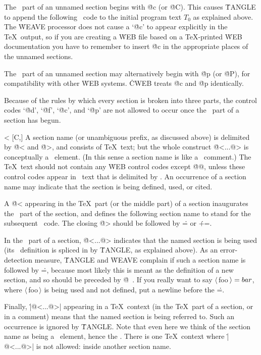\@c [\oP,\oT] The \Cee\ part of an unnamed section begins with \.{@c}
(or \.{@C}). This causes \.{TANGLE} to append the following \Cee\ code
to the initial program text $T_0$ as explained above. The \.{WEAVE}
processor does not cause a `\.{@c}' to appear explicitly in the \TeX\
output, so if you are creating a \.{WEB} file based on a \TeX-printed
\.{WEB} documentation you have to remember to insert \.{@c} in the
appropriate places of the unnamed sections.

\@p [\oP,\oT] The \Cee\ part of an unnamed section may alternatively begin
with \.{@p} (or \.{@P}), for compatibility with other \.{WEB} systems.
\.{CWEB} treats \.{@c} and \.{@p} identically.

\more Because of the rules by which every section is broken into three parts,
the control codes `\.{@d}', `\.{@f}', `\.{@c}', and `\.{@p}'
are not allowed to occur once the \Cee\ part of a section has begun.

\@< [C,\oT] A section name (or unambiguous prefix, as discussed above)
is delimited by \.{@<} and \.{@>}, and consists of \TeX\ text;
but the whole construct \.{@<...@>} is conceptually a \Cee\ element.
(In this sense a section name is like a \Cee\ comment.)
The \TeX\ text should not contain any \.{WEB} control codes
except \.{@@}, unless these control codes appear in \Cee\ text that
is delimited by \pb.  An occurrence of a section name may indicate
that the section is being defined, used, or cited.

\more
A \.{@<} appearing in the \TeX\ part (or the middle part) of a section
inaugurates the \Cee\ part of the section, and defines the following section
name to stand for the subsequent \Cee\ code. The closing \.{@>} should be
followed by \.{=} or \.{+=}.

\more
In the \Cee\ part of a section, \.{@<...@>} indicates that the named
section is being used (its \Cee\ definition is spliced in by
\.{TANGLE}, as explained above).  As an error-detection measure,
\.{TANGLE} and \.{WEAVE} complain if such a section name is followed
by \.=, because most likely this is meant as the definition of a new
section, and so should be preceded by \.{@\ }.  If you really want to
say $\langle\,$foo$\,\rangle=\\{bar}$, where $\langle\,$foo$\,\rangle$
is being used and not defined, put a newline before the \.=.

\more
Finally, \.{|@<...@>|} appearing in a \TeX\ context (in the \TeX\ part
of a section, or in a comment) means that the named section is being
referred to.  Such an occurrence is ignored by \.{TANGLE}. Note that
even here we think of the section name as being a \Cee\ element, hence
the \pb.  There is one \TeX\ context where
\.{|@<...@>|} is not allowed: inside another section name.

